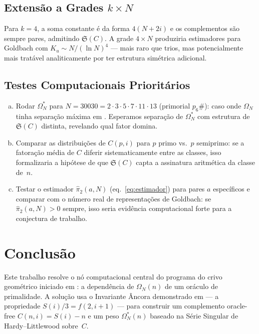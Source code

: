 \documentclass[12pt,a4paper]{article}
\theoremstyle{definition}
\theoremstyle{remark}
\newcommand{\Om}{\Omega_N}           %
\newcommand{\Oms}{\Omega^*_N}        %
\newcommand{\Ss}{\mathfrak{S}}       %
\begin{document}
	\subsection{Extensão a Grades $k\times N$}
	
	Para $k=4$, a soma constante é da forma $4(N+2i)$ e os complementos são
	sempre pares, admitindo $\Ss(C)$.
	A grade $4\times N$ produziria estimadores para Goldbach com
	$K_u\sim N/(\ln N)^4$ --- mais raro que trios, mas potencialmente mais
	tratável analiticamente por ter estrutura simétrica adicional.
	
	\subsection{Testes Computacionais Prioritários}
	
	\begin{enumerate}[(a)]
		\item Rodar $\Oms$ para $N=30030=2\cdot3\cdot5\cdot7\cdot11\cdot13$
		(primorial $p_6\#$): caso onde $\Om$ tinha separação máxima em
		\cite{bandeira2026unif}.
		Esperamos separação de $\Oms$ com estrutura de $\Ss(C)$ distinta,
		revelando qual fator domina.
		
		\item Comparar as distribuições de $C(p,i)$ para $p$ primo vs.\ $p$
		semiprimo: se a fatoração média de $C$ diferir sistematicamente entre
		as classes, isso formalizaria a hipótese de que $\Ss(C)$ capta a
		assinatura aritmética da classe de~$n$.
		
		\item Testar o estimador $\hat\pi_2(a,N)$ (eq.~\eqref{eq:estimador})
		para pares $a$ específicos e comparar com o número real de
		representações de Goldbach: se $\hat\pi_2(a,N)>0$ sempre, isso seria
		evidência computacional forte para a conjectura de trabalho.
	\end{enumerate}
	
	\section{Conclusão}
	
	Este trabalho resolve o nó computacional central do programa do crivo
	geométrico iniciado em \cite{bandeira2026unif}: a dependência de $\Om(n)$
	de um oráculo de primalidade.
	A solução usa o Invariante Âncora demonstrado em \cite{bandeira2026soma} ---
	a propriedade $S(i)/3 = f(2,i{+}1)$ --- para construir um complemento
	oracle-free $C(n,i)=S(i)-n$ e um peso $\Oms(n)$ baseado na Série Singular
	de Hardy--Littlewood sobre~$C$.
	
\end{document}
